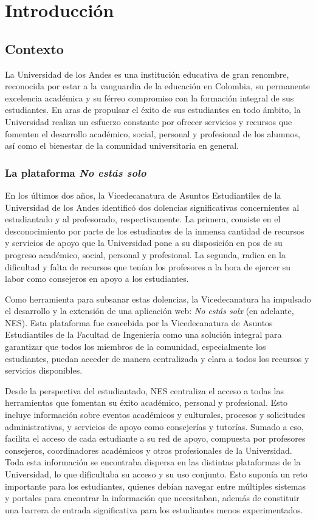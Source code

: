 \chapter{Introducción}

\section{Contexto}

La Universidad de los Andes es una institución educativa de gran renombre, reconocida por estar a la vanguardia de la educación en Colombia, su permanente excelencia académica y su férreo compromiso con la formación integral de sus estudiantes. En aras de propulsar el éxito de sus estudiantes en todo ámbito, la Universidad realiza un esfuerzo constante por ofrecer servicios y recursos que fomenten el desarrollo académico, social, personal y profesional de los alumnos, así como el bienestar de la comunidad universitaria en general.

\subsection{La plataforma \textit{No estás solo}}

En los últimos dos años, la Vicedecanatura de Asuntos Estudiantiles de la Universidad de los Andes identificó dos dolencias significativas concernientes al estudiantado y al profesorado, respectivamente. La primera, consiste en el desconocimiento por parte de los estudiantes de la inmensa cantidad de recursos y servicios de apoyo que la Universidad pone a su disposición en pos de su progreso académico, social, personal y profesional. La segunda, radica en la dificultad y falta de recursos que tenían los profesores a la hora de ejercer su labor como consejeros en apoyo a los estudiantes.

Como herramienta para subsanar estas dolencias, la Vicedecanatura ha impulsado el desarrollo y la extensión de una aplicación web: \textit{No estás solx} (en adelante, \gls{NES}). Esta plataforma fue concebida por la Vicedecanatura de Asuntos Estudiantiles de la Facultad de Ingeniería como una solución integral para garantizar que todos los miembros de la comunidad, especialmente los estudiantes, puedan acceder de manera centralizada y clara a todos los recursos y servicios disponibles.

Desde la perspectiva del estudiantado, \gls{NES} centraliza el acceso a todas las herramientas que fomentan su éxito académico, personal y profesional. Esto incluye información sobre eventos académicos y culturales, procesos y solicitudes administrativas, y servicios de apoyo como consejerías y tutorías. Sumado a eso, facilita el acceso de cada estudiante a su red de apoyo, compuesta por profesores consejeros, coordinadores académicos y otros profesionales de la Universidad. Toda esta información se encontraba dispersa en las distintas plataformas de la Universidad, lo que dificultaba su acceso y su uso conjunto. Esto suponía un reto importante para los estudiantes, quienes debían navegar entre múltiples sistemas y portales para encontrar la información que necesitaban, además de constituir una barrera de entrada significativa para los estudiantes menos experimentados.

